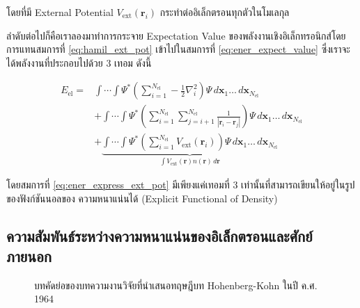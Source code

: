 \noindent โดยที่มี External Potential $V_{\text{ext}}(\bm{r}_{i})$ กระทำต่ออิเล็กตรอนทุกตัวในโมเลกุล 

ลำดับต่อไปก็คือเราลองมาทำการกระจาย Expectation Value ของพลังงานเชิงอิเล็กทรอนิกส์โดยการแทนสมการที่ \ref{eq:hamil_ext_pot} 
เข้าไปในสมการที่ \ref{eq:ener_expect_value} ซึ่งเราจะได้พลังงานที่ประกอบไปด้วย 3 เทอม ดังนี้

\begin{align}\label{eq:ener_express_ext_pot}
    E_{\text{el}} =& \int \cdots \int \Psi^{\ast} 
    \left ( \sum^{N_{\text{el}}}_{i=1} -\frac{1}{2} \nabla^{2}_{i} \right ) 
    \Psi \, d\bm{x}_{1} \dots \, d\bm{x}_{N_{\text{el}}} \nonumber \\
    &+ \int \cdots \int \Psi^{\ast} 
    \left ( \sum^{N_{\text{el}}}_{i=1} \sum^{N_{\text{el}}}_{j=i+1} \frac{1}{|\bm{r}_{i}-\bm{r}_{j}|} \right ) 
    \Psi \, d\bm{x}_{1} \dots \, d\bm{x}_{N_{\text{el}}} \nonumber \\
    &+ \underbrace{\int \cdots \int \Psi^{\ast} 
    \left ( \sum^{N_{\text{el}}}_{i=1} V_{\text{ext}}(\bm{r}_{i}) \right ) 
    \Psi \, d\bm{x}_{1} \dots \, d\bm{x}_{N_{\text{el}}}%
    }_{\textstyle \int V_{\text{ext}}(\bm{r}) n(\bm{r}) \, d\bm{r}}
\end{align}

\noindent โดยสมการที่ \ref{eq:ener_express_ext_pot} มีเพียงแค่เทอมที่ 3 เท่านั้นที่สามารถเขียนให้อยู่ในรูปของฟังก์ชันนอลของ%
ความหนาแน่นได้ (Explicit Functional of Density)

\subsection{ความสัมพันธ์ระหว่างความหนาแน่นของอิเล็กตรอนและศักย์ภายนอก}
\label{ssec:ener_density_ext_pot}

\begin{figure}[H]
    \centering
    \caption{บทคัดย่อของบทความงานวิจัยที่นำเสนอทฤษฎีบท Hohenberg-Kohn ในปี ค.ศ. 1964}
    \label{fig:hohenberg_kohn_abs}
\end{figure}


